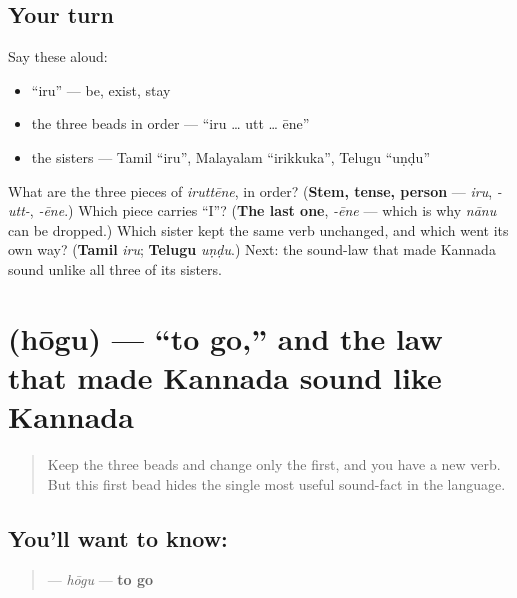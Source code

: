 \subsection*{Your turn}
Say these aloud:

\begin{itemize}
\raggedright
  \item \textquotedblleft{}iru\textquotedblright{} — be, exist, stay
  \item the three beads in order — \textquotedblleft{}iru … utt … ēne\textquotedblright{}
  \item the sisters — Tamil \textquotedblleft{}iru\textquotedblright{}, Malayalam \textquotedblleft{}irikkuka\textquotedblright{}, Telugu \textquotedblleft{}uṇḍu\textquotedblright{}
\end{itemize}

\begin{tcolorbox}[breakable,colback=teal!4,colframe=teal!35!black,title={Before you move on}]
What are the three pieces of \emph{iruttēne}, in order? (\textbf{Stem, tense, person} — \emph{iru}, \emph{-utt-}, \emph{-ēne}.) Which piece carries \textquotedblleft{}I\textquotedblright{}? (\textbf{The last one}, \emph{-ēne} — which is why \emph{nānu} can be dropped.) Which sister kept the same verb unchanged, and which went its own way? (\textbf{Tamil} \emph{iru}; \textbf{Telugu} \emph{uṇḍu}.) Next: the sound-law that made Kannada sound unlike all three of its sisters.
\end{tcolorbox}
\section[\texorpdfstring{\kn{ಹೋಗು} (hōgu)}{ಹೋಗು (hōgu)}]{ (hōgu) — \textquotedblleft{}to go,\textquotedblright{} and the law that made Kannada sound like Kannada}

\label{lesson:KA-C32-hoogu}



\begin{quote}
Keep the three beads and change only the first, and you have a new verb. But this first bead hides the single most useful sound-fact in the language.
\end{quote}

\subsection*{You'll want to know: }
\begin{quote}
\textbf{} — \emph{hōgu} — \textbf{to go}
\end{quote}

